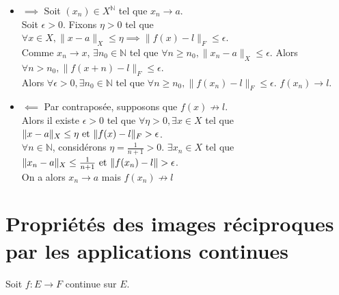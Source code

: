 \documentclass[]{article}
\begin{document}
\begin{itemize}
    \item $\boxed{\implies}$
    Soit $(x_n) \in X^{\mathbb{N}}$ tel que $x_n \longrightarrow a$. \\

    Soit $\epsilon > 0$. Fixons $\eta > 0$ tel que $\forall x \in X, \|x-a\|_X \leq \eta \implies \|f(x) - l\|_F \leq \epsilon$. \\

    Comme $x_n \longrightarrow x$, $\exists n_0 \in \mathbb{N}$ tel que $\forall n \geq n_0, \| x_n - a \|_X \leq \epsilon$. Alors $\forall n > n_0, \|f(x+n) - l\|_F \leq \epsilon$. \\

    Alors $\forall \epsilon > 0, \exists n_0 \in \mathbb{N}$ tel que $\forall n \geq n_0, \|f(x_n) - l\|_F \leq \epsilon$. $f(x_n) \longrightarrow l. $

    \item $\boxed{\impliedby}$
    Par contraposée, supposons que $f(x) \not \longrightarrow l$. \\

    Alors il existe $\epsilon > 0$ tel que $\forall \eta > 0, \exists x \in X$ tel que $\|x-a\|_X \leq \eta \text{ et } \|f(x)-l\|_F > \epsilon$.\\

    $\forall n \in \mathbb{N}$, considérons $\eta = \frac{1}{n+1} > 0$. $\exists x_n \in X$ tel que $\|x_n - a\|_X \leq \frac{1}{n+1} \text{ et } \|f(x_n) - l\| > \epsilon$. \\
    
    On a alors $x_n \longrightarrow a$ mais $f(x_n) \not \longrightarrow l$
\end{itemize}
\clearpage
\section{Propriétés des images réciproques par les applications continues}

Soit $f:E\rightarrow F$ continue sur $E$. 
\end{document}
